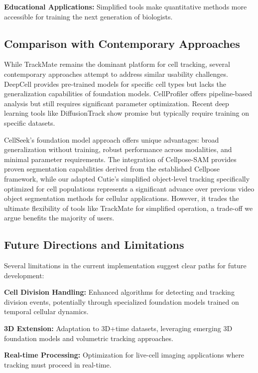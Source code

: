 \documentclass[../cellseek_paper.tex]{subfiles}
\begin{document}
\textbf{Educational Applications:} Simplified tools make quantitative methods more accessible for training the next generation of biologists.

\subsection{Comparison with Contemporary Approaches}

While TrackMate \cite{tinevez2017trackmate} remains the dominant platform for cell tracking, several contemporary approaches attempt to address similar usability challenges. DeepCell provides pre-trained models for specific cell types but lacks the generalization capabilities of foundation models. CellProfiler offers pipeline-based analysis but still requires significant parameter optimization. Recent deep learning tools like DiffusionTrack show promise but typically require training on specific datasets.

CellSeek's foundation model approach offers unique advantages: broad generalization without training, robust performance across modalities, and minimal parameter requirements. The integration of Cellpose-SAM provides proven segmentation capabilities derived from the established Cellpose framework, while our adapted Cutie's simplified object-level tracking specifically optimized for cell populations represents a significant advance over previous video object segmentation methods for cellular applications. However, it trades the ultimate flexibility of tools like TrackMate \cite{tinevez2017trackmate} for simplified operation, a trade-off we argue benefits the majority of users.

\subsection{Future Directions and Limitations}

Several limitations in the current implementation suggest clear paths for future development:

\textbf{Cell Division Handling:} Enhanced algorithms for detecting and tracking division events, potentially through specialized foundation models trained on temporal cellular dynamics.

\textbf{3D Extension:} Adaptation to 3D+time datasets, leveraging emerging 3D foundation models and volumetric tracking approaches.

\textbf{Real-time Processing:} Optimization for live-cell imaging applications where tracking must proceed in real-time.
\end{document}
